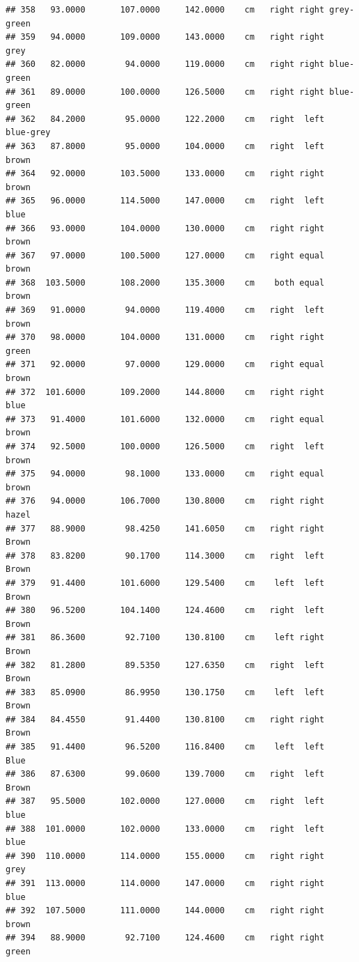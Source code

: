\documentclass[]{article}
\begin{document}
\begin{verbatim}
## 358   93.0000       107.0000     142.0000    cm   right right grey-green
## 359   94.0000       109.0000     143.0000    cm   right right       grey
## 360   82.0000        94.0000     119.0000    cm   right right blue-green
## 361   89.0000       100.0000     126.5000    cm   right right blue-green
## 362   84.2000        95.0000     122.2000    cm   right  left  blue-grey
## 363   87.8000        95.0000     104.0000    cm   right  left      brown
## 364   92.0000       103.5000     133.0000    cm   right right      brown
## 365   96.0000       114.5000     147.0000    cm   right  left       blue
## 366   93.0000       104.0000     130.0000    cm   right right      brown
## 367   97.0000       100.5000     127.0000    cm   right equal      brown
## 368  103.5000       108.2000     135.3000    cm    both equal      brown
## 369   91.0000        94.0000     119.4000    cm   right  left      brown
## 370   98.0000       104.0000     131.0000    cm   right right      green
## 371   92.0000        97.0000     129.0000    cm   right equal      brown
## 372  101.6000       109.2000     144.8000    cm   right right       blue
## 373   91.4000       101.6000     132.0000    cm   right equal      brown
## 374   92.5000       100.0000     126.5000    cm   right  left      brown
## 375   94.0000        98.1000     133.0000    cm   right equal      brown
## 376   94.0000       106.7000     130.8000    cm   right right      hazel
## 377   88.9000        98.4250     141.6050    cm   right right      Brown
## 378   83.8200        90.1700     114.3000    cm   right  left      Brown
## 379   91.4400       101.6000     129.5400    cm    left  left      Brown
## 380   96.5200       104.1400     124.4600    cm   right  left      Brown
## 381   86.3600        92.7100     130.8100    cm    left right      Brown
## 382   81.2800        89.5350     127.6350    cm   right  left      Brown
## 383   85.0900        86.9950     130.1750    cm    left  left      Brown
## 384   84.4550        91.4400     130.8100    cm   right right      Brown
## 385   91.4400        96.5200     116.8400    cm    left  left       Blue
## 386   87.6300        99.0600     139.7000    cm   right  left      Brown
## 387   95.5000       102.0000     127.0000    cm   right  left       blue
## 388  101.0000       102.0000     133.0000    cm   right  left       blue
## 390  110.0000       114.0000     155.0000    cm   right right       grey
## 391  113.0000       114.0000     147.0000    cm   right right       blue
## 392  107.5000       111.0000     144.0000    cm   right right      brown
## 394   88.9000        92.7100     124.4600    cm   right right      green

\end{verbatim}
\end{document}
